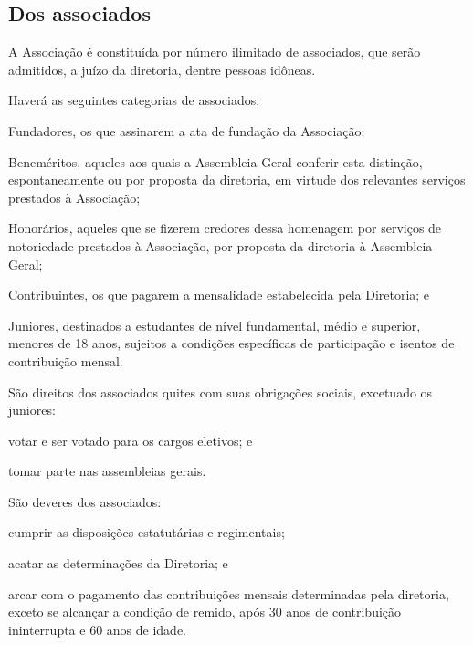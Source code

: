 \documentclass{estatuto}
\begin{document}
\begin{artigos}
		\section{Dos associados}
			\item A Associação é constituída por número ilimitado de associados, que serão admitidos, a juízo da diretoria, dentre pessoas idôneas.
			\item Haverá as seguintes categorias de associados:
				\begin{itens}
					\item Fundadores, os que assinarem a ata de fundação da Associação;
					\item Beneméritos, aqueles aos quais a Assembleia Geral conferir esta distinção, espontaneamente ou por proposta da diretoria, em virtude dos relevantes serviços prestados à Associação;
					\item Honorários, aqueles que se fizerem credores dessa homenagem por serviços de notoriedade prestados à Associação, por proposta da diretoria à Assembleia Geral;
					\item Contribuintes, os que pagarem a mensalidade estabelecida pela Diretoria; e
					\item Juniores, destinados a estudantes de nível fundamental, médio e superior, menores de 18 anos, sujeitos a condições específicas de participação e isentos de contribuição mensal.
				\end{itens}
			\item São direitos dos associados quites com suas obrigações sociais, excetuado os juniores:
				\begin{itens}
					\item votar e ser votado para os cargos eletivos; e
					\item tomar parte nas assembleias gerais.
				\end{itens}
			\item São deveres dos associados:
				\begin{itens}
					\item cumprir as disposições estatutárias e regimentais;
					\item acatar as determinações da Diretoria; e
					\item arcar com o pagamento das contribuições mensais determinadas pela diretoria, exceto se alcançar a condição de remido, após 30 anos de contribuição ininterrupta e 60 anos de idade.
				\end{itens}

\end{artigos}
\end{document}
